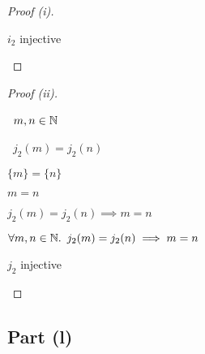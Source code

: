\begin{prop}
\begin{proof}[Proof (i)]
\begin{itemize}
        \step[\iffs]
          $i_2$ injective
          \qedhere
    \end{itemize}
  \end{proof}

  \begin{proof}[Proof (ii)]~\\
    \begin{itemize}
      \step
        \begin{itemize}
          \subp{\star}
            \Let~$m,n\in\mathbb{N}$
            \marginnote{\Hyp}

          \step
            \begin{itemize}
              \subp{\dagger}
                \Ass~$j_2(m) = j_2(n)$
                \marginnote{\Hyp}

              \step[\iffs]
                $\{m\} = \{n\}$

              \step[\iffs] $m = n$
            \end{itemize}
            \step[\imps]
              $j_2(m) = j_2(n) \implies m = n$
              \marginnote{$\imps$-\Intro}
        \end{itemize}

        \step[\imps]
          $\forall m,n\in\mathbb{N}\ldotp~j_2(m) = j_2(n) \implies m = n$
          \marginnote{$\forall$-\Intro}

        \step[\iffs]
          $j_2$ injective
          \qedhere
    \end{itemize}
  \end{proof}
\end{prop}

\subsection{Part (l)}\label{sec:q-2-l}

